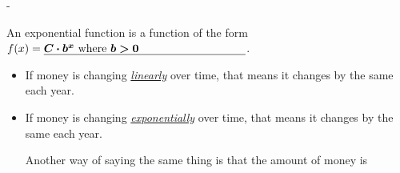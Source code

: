 \documentclass{article}
\makeatletter
\newlength{\tipmargin}
\renewenvironment{framed}{
  \setlength{\tipmargin}{\textwidth-\linewidth}
  \advance\@totalleftmargin-\tipmargin
  \def\FrameCommand{\hspace{\tipmargin}\fbox}%
  \advance\linewidth\tipmargin
  \MakeFramed {\advance\hsize-\width \FrameRestore}%
}
{\endMakeFramed}
\makeatother
\begin{document}
\begin{framed}
  \smallskip
  An exponential function is a function of the form $f(x) =
  \fitb{2.5in}{C \cdot b^x \text{ where } b > 0}$.
  \begin{itemize}
  \item If money is changing \uline{\emph{linearly}} over time, that means it changes by the same  each year.

  \item If money is changing \uline{\emph{exponentially}} over time, that means it changes by the same  each year.

    Another way of saying the same thing is that the amount of money is 

    \probonly{\bigskip}
  \end{itemize}
\end{framed}

\pspace{\newpage}
\end{document}
